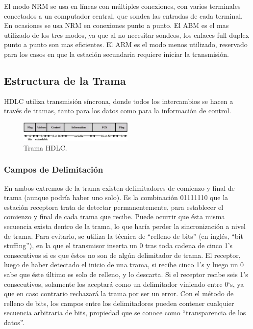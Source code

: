 \documentclass[withindex,glossary]{cam-thesis}
\begin{document}
El modo NRM se usa en líneas con múltiples conexiones, con varios terminales conectados a un computador central, que sondea las entradas de cada terminal. En ocasiones se usa NRM en conexiones punto a punto. El ABM es el mas utilizado de los tres modos, ya que al no necesitar sondeos, los enlaces full duplex punto a punto son mas eficientes.
El ARM es el modo menos utilizado, reservado para los casos en que la estación secundaria requiere iniciar la transmisión.

\subsection{Estructura de la Trama}
HDLC utiliza transmisión síncrona, donde todos los intercambios se hacen a través de tramas, tanto para los datos como para la información de control.

\begin{figure}[H]
\centering
\includegraphics[width=0.5\textwidth]{images/HDLC_Frame}
\caption[Trama HDLC]{Trama HDLC.}
\end{figure}

\subsubsection{Campos de Delimitación}
En ambos extremos de la trama existen delimitadores de comienzo y final de trama (aunque podría haber uno solo). Es la combinación 01111110 que la estación receptora trata de detectar permanentemente, para establecer el comienzo y final de cada trama que recibe. Puede ocurrir que ésta misma secuencia exista dentro de la trama, lo que haría perder la sincronización a nivel de trama. Para evitarlo, se utiliza la técnica de “relleno de bits” (en inglés, “bit stuffing”), en la que el transmisor inserta un 0 tras toda cadena de cinco 1’s consecutivos si es que éstos no son de
algún delimitador de trama. El receptor, luego de haber detectado el inicio de una trama, si recibe cinco 1’s y luego un 0 sabe que éste último es solo de relleno, y lo descarta. Si el receptor recibe seis 1’s consecutivos, solamente los aceptará como un delimitador viniendo entre 0`s, ya que en caso contrario rechazará la trama por ser un error. Con el método de relleno de bits, los campos entre los delimitadores pueden contener cualquier secuencia arbitraria de bits, propiedad que se conoce como “transparencia de los datos”.
\end{document}
